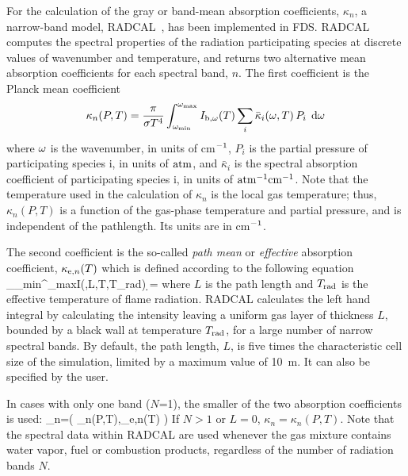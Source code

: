 For the calculation of the gray or band-mean absorption coefficients, $\kappa_n$, a narrow-band model, RADCAL~\cite{RadCal}, has been
implemented in FDS. RADCAL computes the spectral properties of the radiation participating species at discrete values of wavenumber and temperature,
and returns two alternative mean absorption coefficients for each spectral band, $n$. The first coefficient is the Planck mean coefficient
\begin{equation}
\kappa_n(P,T) = \dfrac{\pi}{\sigma T^4}
\displaystyle\int_{\omega_{\min}}^{\omega_{\max}}{I_{\rm b,\omega}(T)
\displaystyle\sum_i \bar{\kappa}_i(\omega,T) \, P_i \; \,\mathrm{d} \omega}
\end{equation}
where $\omega$ is the wavenumber, in units of cm$^{\rm -1}$,
$P_i$ is the partial pressure of participating species i, in units of ${\rm atm}$, and
$\bar{\kappa}_i$ is the spectral absorption coefficient of participating species i, in units of ${\rm atm^{-1}cm^{-1}}$.
Note that the temperature used in the calculation of $\kappa_n$ is the local gas temperature; thus, $\kappa_n(P,T)$ is a function
of the gas-phase temperature and partial pressure, and is independent of the pathlength. Its units are in cm$^{\rm -1}$.

The second coefficient is the so-called {\em path mean} or {\em effective} absorption coefficient, $\kappa_{{\rm e},n}(T)$ which is defined according to the following
equation
\be
\int_{\la_{\rm min}}^{\la_{\rm max}}I(\la,L,T,T_{\rm rad}) \; \d \la = \frac{\sigma}{\pi}
\ee
where $L$ is the path length and $T_{\rm rad}$ is the effective temperature of flame radiation. RADCAL calculates the left hand
integral by calculating the intensity leaving a uniform gas layer of thickness $L$, bounded by a black wall at temperature $T_{\rm rad}$, for
a large number of narrow spectral bands.  By default, the path length, $L$,
is five times the characteristic cell size of the simulation, limited by a maximum value of 10~m. It can also be specified by the user.

In cases with only one band ($N$=1), the smaller of the two absorption coefficients is used:
\be 
   \kappa_n=\min \left( \kappa_n(P,T),\kappa_{{\rm e},n}(T) \right)
\ee
If $N>1$ or $L=0$, $\kappa_n=\kappa_n(P,T)$. Note that the spectral data within RADCAL are used whenever the gas mixture contains water vapor,
fuel or combustion products, regardless of the number of radiation bands $N$.

